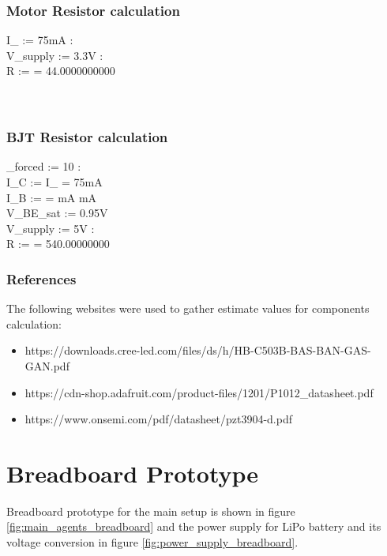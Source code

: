 \documentclass[a4paper]{article}
\begin{document}
\subsubsection{Motor Resistor calculation}

I_{\max} := 75mA : \\
V_{supply} := 3.3V : \\
R :=  = 44.0000000000 \Omega \\
\\
\\

\subsubsection{BJT Resistor calculation}

\beta_{forced} := 10 : \\
I_C := I_{\max} = 75mA \\
I_B :=  =  mA   mA \\
V_{BE\_sat} := 0.95V \\
V_{supply} := 5V : \\
R :=  = 540.00000000 \Omega \\


\subsubsection{References}

\noindent The following websites were used to gather estimate values for components calculation:
\begin{itemize}
\item https://downloads.cree-led.com/files/ds/h/HB-C503B-BAS-BAN-GAS-GAN.pdf
\item https://cdn-shop.adafruit.com/product-files/1201/P1012\_datasheet.pdf
\item https://www.onsemi.com/pdf/datasheet/pzt3904-d.pdf
\end{itemize}


\section{Breadboard Prototype}

\noindent Breadboard prototype for the main setup is shown in figure \ref{fig:main_agents_breadboard} and the power supply for LiPo battery and its voltage conversion in figure \ref{fig:power_supply_breadboard}.
\end{document}
